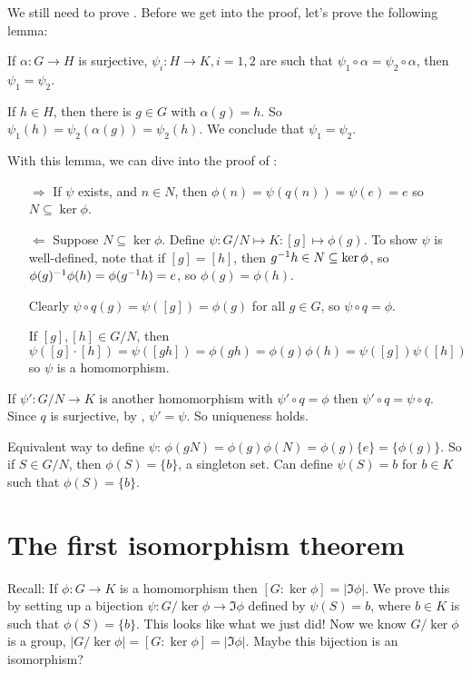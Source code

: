 We still need to prove . Before we get into the proof, let's prove the following lemma:

\begin{lemma}
If $\alpha:G\to H$ is surjective, $\psi_i:H\to K,i=1,2$ are such that $\psi_1\circ \alpha = \psi_2\circ \alpha$, then $\psi_1=\psi_2$.
\end{lemma}

\begin{pf}
If $h\in H$, then there is $g\in G$ with $\alpha(g)=h$. So $\psi_1(h)=\psi_2(\alpha(g))=\psi_2(h)$. We conclude that $\psi_1=\psi_2$.
\end{pf}

With this lemma, we can dive into the proof of :
\begin{pf}
\begin{itemize}
\item[$\Rightarrow$] If $\psi$ exists, and $n\in N$, then $\phi(n)=\psi(q(n))=\psi(e)=e$ so $N\subseteq \ker\phi$.
\item[$\Leftarrow$] Suppose $N\subseteq \ker\phi$. Define $\psi:G/N\mapsto K:[g]\mapsto \phi(g)$. To show $\psi$ is well-defined, note that if $[g]=[h]$, then $g^{-1} h\in N\subseteq \ker \phi$, so $\phi(g)^{-1} \phi(h)=\phi(g^{-1} h)=e$, so $\phi(g)=\phi(h)$.

Clearly $\psi\circ q(g)= \psi([g])=\phi(g)$ for all $g\in G$, so $\psi\circ q=\phi$.

If $[g],[h]\in G/N$, then 
$$\psi([g] \cdot[h])=\psi([g h])=\phi(g h)=\phi(g) \phi(h)=\psi([g]) \psi([h])$$
so $\psi$ is a homomorphism.
\end{itemize}
If $\psi': G/N \to K$ is another homomorphism with $\psi'\circ q=\phi$ then $\psi'\circ q=\psi\circ q$. Since $q$ is surjective, by , $\psi'=\psi$. So uniqueness holds.
\end{pf}
\begin{remark}
Equivalent way to define $\psi$: $\phi(gN)= \phi(g)\phi(N) = \phi(g)\{e\} = \{\phi(g)\}$. So if $S\in G/N$, then $\phi(S)=\{b\}$, a singleton set. Can define $\psi(S)=b$ for $b\in K$ such that $\phi(S)=\{b\}$.
\end{remark}

\section{The first isomorphism theorem}
Recall: If $\phi:G\to K$ is a homomorphism then $[G:\ker\phi]=|\Im \phi|$. We prove this by setting up a bijection $\psi:G/\ker\phi\to \Im\phi$ defined by $\psi(S)=b$, where $b\in K$ is such that $\phi(S)=\{b\}$. This looks like what we just did! Now we know $G/\ker\phi$ is a group, $|G/\ker\phi|=[G:\ker\phi]=|\Im\phi|$. Maybe this bijection is an isomorphism?

